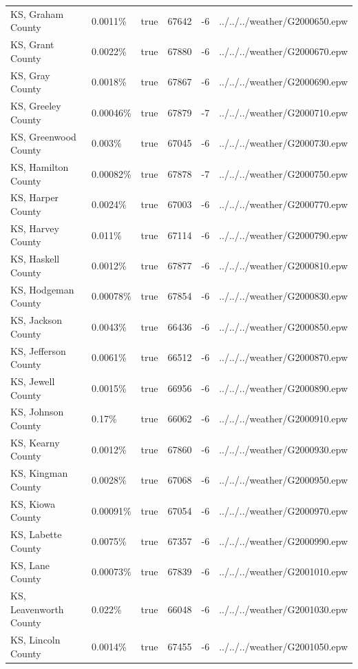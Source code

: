 \begin{longtable}[]{@{}llllll@{}}
KS, Graham County & 0.0011\% & true & 67642 & -6 &
../../../weather/G2000650.epw \\
KS, Grant County & 0.0022\% & true & 67880 & -6 &
../../../weather/G2000670.epw \\
KS, Gray County & 0.0018\% & true & 67867 & -6 &
../../../weather/G2000690.epw \\
KS, Greeley County & 0.00046\% & true & 67879 & -7 &
../../../weather/G2000710.epw \\
KS, Greenwood County & 0.003\% & true & 67045 & -6 &
../../../weather/G2000730.epw \\
KS, Hamilton County & 0.00082\% & true & 67878 & -7 &
../../../weather/G2000750.epw \\
KS, Harper County & 0.0024\% & true & 67003 & -6 &
../../../weather/G2000770.epw \\
KS, Harvey County & 0.011\% & true & 67114 & -6 &
../../../weather/G2000790.epw \\
KS, Haskell County & 0.0012\% & true & 67877 & -6 &
../../../weather/G2000810.epw \\
KS, Hodgeman County & 0.00078\% & true & 67854 & -6 &
../../../weather/G2000830.epw \\
KS, Jackson County & 0.0043\% & true & 66436 & -6 &
../../../weather/G2000850.epw \\
KS, Jefferson County & 0.0061\% & true & 66512 & -6 &
../../../weather/G2000870.epw \\
KS, Jewell County & 0.0015\% & true & 66956 & -6 &
../../../weather/G2000890.epw \\
KS, Johnson County & 0.17\% & true & 66062 & -6 &
../../../weather/G2000910.epw \\
KS, Kearny County & 0.0012\% & true & 67860 & -6 &
../../../weather/G2000930.epw \\
KS, Kingman County & 0.0028\% & true & 67068 & -6 &
../../../weather/G2000950.epw \\
KS, Kiowa County & 0.00091\% & true & 67054 & -6 &
../../../weather/G2000970.epw \\
KS, Labette County & 0.0075\% & true & 67357 & -6 &
../../../weather/G2000990.epw \\
KS, Lane County & 0.00073\% & true & 67839 & -6 &
../../../weather/G2001010.epw \\
KS, Leavenworth County & 0.022\% & true & 66048 & -6 &
../../../weather/G2001030.epw \\
KS, Lincoln County & 0.0014\% & true & 67455 & -6 &
../../../weather/G2001050.epw \\

\end{longtable}
